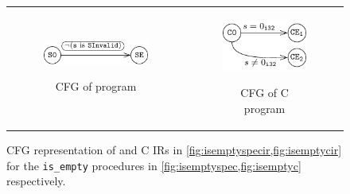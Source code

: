 \begin{figure}
\begin{tabular}{@{}c@{}c@{}}
\begin{subfigure}[b]{0.5\textwidth}
\begin{center}
{\includegraphics[scale=1.4]{chapters/figures/figIsEmptySpecCFG.pdf}}
\end{center}
\vspace{20px}
\caption{\label{fig:isemptyspeccfg}CFG of \SpecL{} program}
\end{subfigure}%
&
\begin{subfigure}[b]{0.5\textwidth}
\begin{center}
{\includegraphics[scale=1.4]{chapters/figures/figIsEmptyCCFG.pdf}}
\end{center}
\caption{\label{fig:isemptyccfg}CFG of C program}
\end{subfigure}%
\\
\end{tabular}
\caption{\label{fig:isemptyspecandccfg}CFG representation of \SpecL{} and C IRs in \cref{fig:isemptyspecir,fig:isemptycir} for the {\tt is\_empty} procedures in \cref{fig:isemptyspec,fig:isemptyc} respectively.}
\end{figure}
